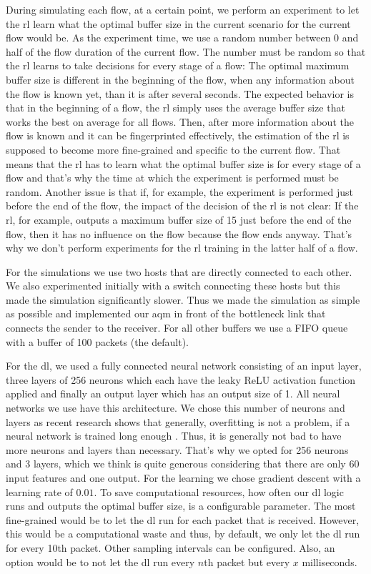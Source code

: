 \documentclass[conference]{IEEEtran}
\begin{document}
During simulating each flow, at a certain point, we perform an experiment to let the \gls{rl} learn what the optimal buffer size in the current scenario for the current flow would be. As the experiment time, we use a random number between 0 and half of the flow duration of the current flow. The number must be random so that the \gls{rl} learns to take decisions for every stage of a flow: The optimal maximum buffer size is different in the beginning of the flow, when any information about the flow is known yet, than it is after several seconds. The expected behavior is that in the beginning of a flow, the \gls{rl} simply uses the average buffer size that works the best on average for all flows. Then, after more information about the flow is known and it can be fingerprinted effectively, the estimation of the \gls{rl} is supposed to become more fine-grained and specific to the current flow. That means that the \gls{rl} has to learn what the optimal buffer size is for every stage of a flow and that's why the time at which the experiment is performed must be random. Another issue is that if, for example, the experiment is performed just before the end of the flow, the impact of the decision of the \gls{rl} is not clear: If the \gls{rl}, for example, outputs a maximum buffer size of 15 just before the end of the flow, then it has no influence on the flow because the flow ends anyway. That's why we don't perform experiments for the \gls{rl} training in the latter half of a flow.  

For the simulations we use two hosts that are directly connected to each other. We also experimented initially with a switch connecting these hosts but this made the simulation significantly slower. Thus we made the simulation as simple as possible and implemented our \gls{aqm} in front of the bottleneck link that connects the sender to the receiver. For all other buffers we use a FIFO queue with a buffer of 100 packets (the default). 

For the \gls{dl}, we used a fully connected neural network consisting of an input layer, three layers of 256 neurons which each have the leaky ReLU \cite{noauthor_rectifier_2020} activation function applied and finally an output layer which has an output size of 1. All neural networks we use have this architecture. We chose this number of neurons and layers as recent research shows that generally, overfitting is not a problem, if a neural network is trained long enough \cite{nakkiran_deep_2019}. Thus, it is generally not bad to have more neurons and layers than necessary. That's why we opted for 256 neurons and 3 layers, which we think is quite generous considering that there are only 60 input features and one output. For the learning we chose gradient descent with a learning rate of $0.01$. To save computational resources, how often our \gls{dl} logic runs and outputs the optimal buffer size, is a configurable parameter. The most fine-grained would be to let the \gls{dl} run for each packet that is received. However, this would be a computational waste and thus, by default, we only let the \gls{dl} run for every 10th packet. Other sampling intervals can be configured. Also, an option would be to not let the \gls{dl} run every $n$th packet but every $x$ milliseconds. 
\end{document}
